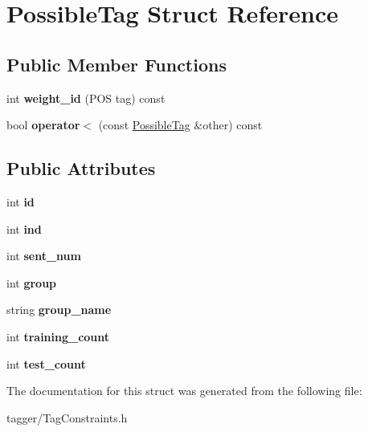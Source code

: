 \hypertarget{structPossibleTag}{
\section{PossibleTag Struct Reference}
\label{structPossibleTag}
}
\subsection*{Public Member Functions}
\begin{DoxyCompactItemize}
\item 
\hypertarget{structPossibleTag_a63f51fa07de58355955633c1fc5ec5c7}{
int {\bfseries weight\_\-id} (POS tag) const }
\label{structPossibleTag_a63f51fa07de58355955633c1fc5ec5c7}

\item 
\hypertarget{structPossibleTag_a83442edca34aefb4376d36dee744a28b}{
bool {\bfseries operator$<$} (const \hyperlink{structPossibleTag}{PossibleTag} \&other) const }
\label{structPossibleTag_a83442edca34aefb4376d36dee744a28b}

\end{DoxyCompactItemize}
\subsection*{Public Attributes}
\begin{DoxyCompactItemize}
\item 
\hypertarget{structPossibleTag_a8c69b59e1e75a5f80623cce26baacabb}{
int {\bfseries id}}
\label{structPossibleTag_a8c69b59e1e75a5f80623cce26baacabb}

\item 
\hypertarget{structPossibleTag_a822aff1087d9f91882bf45da7f129e75}{
int {\bfseries ind}}
\label{structPossibleTag_a822aff1087d9f91882bf45da7f129e75}

\item 
\hypertarget{structPossibleTag_a26244f2c445f233652e4c3ffebafa894}{
int {\bfseries sent\_\-num}}
\label{structPossibleTag_a26244f2c445f233652e4c3ffebafa894}

\item 
\hypertarget{structPossibleTag_a25eb72efa84dc8e030a928c091391609}{
int {\bfseries group}}
\label{structPossibleTag_a25eb72efa84dc8e030a928c091391609}

\item 
\hypertarget{structPossibleTag_afcfa2ffd67a92a564d5c16aa3945b8a0}{
string {\bfseries group\_\-name}}
\label{structPossibleTag_afcfa2ffd67a92a564d5c16aa3945b8a0}

\item 
\hypertarget{structPossibleTag_adc65412fc67deda1ac5554fdbb0264d2}{
int {\bfseries training\_\-count}}
\label{structPossibleTag_adc65412fc67deda1ac5554fdbb0264d2}

\item 
\hypertarget{structPossibleTag_ae933b21144c99f1197a5254e8ceb1c7c}{
int {\bfseries test\_\-count}}
\label{structPossibleTag_ae933b21144c99f1197a5254e8ceb1c7c}

\end{DoxyCompactItemize}


The documentation for this struct was generated from the following file:\begin{DoxyCompactItemize}
\item 
tagger/TagConstraints.h\end{DoxyCompactItemize}
